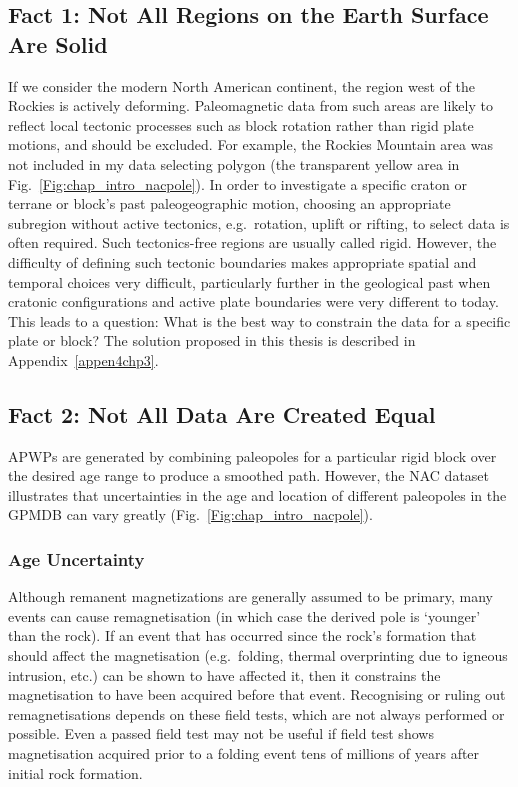 \subsection{Fact 1: Not All Regions on the Earth Surface Are
Solid}\label{sec:f1}

If we consider the modern North American continent, the region west of the
Rockies is actively deforming. Paleomagnetic data from such areas are likely to
reflect local tectonic processes such as block rotation rather than rigid plate
motions, and should be excluded. For example, the Rockies Mountain area was not
included in my data selecting polygon (the transparent yellow area in
Fig.~\ref{Fig:chap_intro_nacpole}). In order to investigate a specific craton or
terrane or block's past paleogeographic motion, choosing an appropriate
subregion without active tectonics, e.g.\ rotation, uplift or rifting, to select
data is often required. Such tectonics-free regions are usually called rigid.
However, the difficulty of defining such tectonic boundaries makes appropriate
spatial and temporal choices very difficult, particularly further in the
geological past when cratonic configurations and active plate boundaries were
very different to today. This leads to a question: What is the best way to
constrain the data for a specific plate or block? The solution proposed in this
thesis is described in Appendix~\ref{appen4chp3}.

\subsection{Fact 2: Not All Data Are Created Equal}\label{sec:f2}

APWPs are generated by combining paleopoles for a particular rigid block over
the desired age range to produce a smoothed path. However, the NAC dataset
illustrates that uncertainties in the age and location of different paleopoles
in the GPMDB can vary greatly (Fig.~\ref{Fig:chap_intro_nacpole}).

\subsubsection{Age Uncertainty}\label{sec:ageu}

Although remanent magnetizations are generally assumed to be primary, many
events can cause remagnetisation (in which case the derived pole is `younger'
than the rock). If an event that has occurred since the rock's formation that
should affect the magnetisation (e.g.\ folding, thermal overprinting due to
igneous intrusion, etc.) can be shown to have affected it, then it constrains
the magnetisation to have been acquired before that event. Recognising or ruling
out remagnetisations depends on these field tests, which are not always
performed or possible. Even a passed field test may not be useful if field test
shows magnetisation acquired prior to a folding event tens of millions of years
after initial rock formation.

